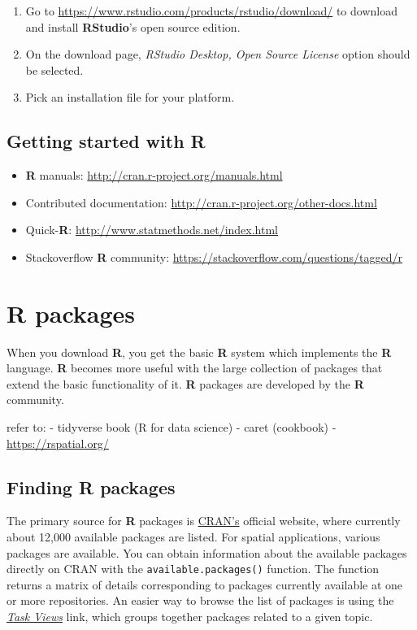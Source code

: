 \documentclass[
  10pt,
  b5paper,
  oneside]{book}
\providecommand{\tightlist}{%
  \setlength{\itemsep}{0pt}\setlength{\parskip}{0pt}}
\begin{document}
\begin{enumerate}
\def\labelenumi{\arabic{enumi}.}
\tightlist
\item
  Go to \url{https://www.rstudio.com/products/rstudio/download/} to download and install \textbf{RStudio}'s open source edition.
\item
  On the download page, \emph{RStudio Desktop, Open Source License} option should be selected.
\item
  Pick an installation file for your platform.
\end{enumerate}

\hypertarget{getting-started-with-r}{%
\subsection{Getting started with R}\label{getting-started-with-r}}

\begin{itemize}
\tightlist
\item
  \textbf{R} manuals: \url{http://cran.r-project.org/manuals.html}
\item
  Contributed documentation: \url{http://cran.r-project.org/other-docs.html}
\item
  Quick-\textbf{R}: \url{http://www.statmethods.net/index.html}
\item
  Stackoverflow \textbf{R} community: \url{https://stackoverflow.com/questions/tagged/r}
\end{itemize}

\hypertarget{r-packages}{%
\section{R packages}\label{r-packages}}

When you download \textbf{R}, you get the basic \textbf{R} system which implements the \textbf{R} language. \textbf{R} becomes more useful with the large collection of packages that extend the basic functionality of it. \textbf{R} packages are developed by the \textbf{R} community.

refer to:
- tidyverse book (R for data science)
- caret (cookbook)
- \url{https://rspatial.org/}

\hypertarget{finding-r-packages}{%
\subsection{Finding R packages}\label{finding-r-packages}}

The primary source for \textbf{R} packages is \href{https://cran.r-project.org/}{CRAN's} official website, where currently about 12,000 available packages are listed. For spatial applications, various packages are available. You can obtain information about the available packages directly on CRAN with the \texttt{available.packages()} function. The function returns a matrix of details corresponding to packages currently available at one or more repositories. An easier way to browse the list of packages is using the \href{https://cran.r-project.org/web/views/}{\emph{Task Views}} link, which groups together packages related to a given topic.
\end{document}
